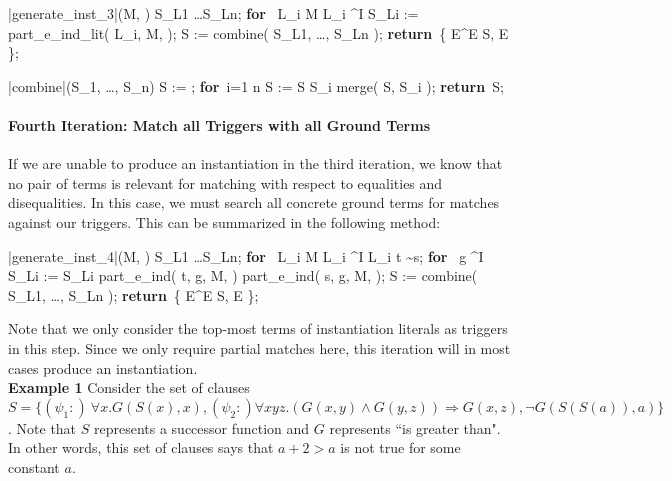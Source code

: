 \documentclass{llncs}
\def\RETURN{\keyword{return}\ }
\def\ENDPROC{\untab}
\def\DOFOR{\qtab\keyword{for}\ }
\def\ENDFOR{\untab}
\def\keyword#1{\mbox{\normalshape\bf #1}}
\begin{document}
\begin{minipage}[t]{.4\linewidth}
\begin{program}
\PROC |generate\_inst_3|(M, \psi) \BODY
S_{L1} \ldots S_{Ln};
\DOFOR {} L_i \in M  L_i \mapsto^I \psi
  S_{Li} := part\_e\_ind\_lit( L_i, M, \psi );
\ENDFOR
S := combine( S_{L1}, \ldots, S_{Ln} );
\RETURN \{ E^\varepsilon \mid E \in S, E  \};
\ENDPROC
\end{program}
\end{minipage}
\begin{minipage}[t]{.4\linewidth}
\begin{program}
\PROC |combine|(S_1, \ldots, S_n) \BODY
S := \emptyset;
\DOFOR i=1 \TO n
  S := S \cup S_i \cup merge( S, S_i );
\ENDFOR
\RETURN S;
\ENDPROC
\end{program}
\end{minipage}

\paragraph{Fourth Iteration: Match all Triggers with all Ground Terms}

If we are unable to produce an instantiation in the third iteration, we know that no pair of terms is relevant for matching with respect to equalities and disequalities.
In this case, we must search all concrete ground terms for matches against our triggers.
This can be summarized in the following method:

\begin{minipage}[t]{.4\linewidth}
\begin{program}
\PROC |generate\_inst_4|(M, \psi) \BODY
S_{L1} \ldots S_{Ln};
\DOFOR {} L_i \in M  L_i \mapsto^I \psi
  L_i  t \sim s;
  \DOFOR {} g \mapsto^I \emptyset
    S_{Li} := S_{Li} \cup part\_e\_ind( t, g, M, \psi ) \cup part\_e\_ind( s, g, M, \psi );
  \ENDFOR
\ENDFOR
S := combine( S_{L1}, \ldots, S_{Ln} );
\RETURN \{ E^\varepsilon \mid E \in S, E  \};
\ENDPROC
\end{program}
\end{minipage}

Note that we only consider the top-most terms of instantiation literals as triggers in this step.
Since we only require partial matches here, this iteration will in most cases produce an instantiation. \\

{\bf Example 1}
Consider the set of clauses $S = \{ (\psi_1 :) \ \forall x. G( S( x ), x), (\psi_2 :) \forall xyz. (G(x,y) \wedge G(y,z)) \Rightarrow G(x,z), \neg G( S(S(a)), a) \}$.
Note that $S$ represents a successor function and $G$ represents ``is greater than".  
In other words, this set of clauses says that $a + 2 > a$ is not true for some constant $a$.
\end{document}

